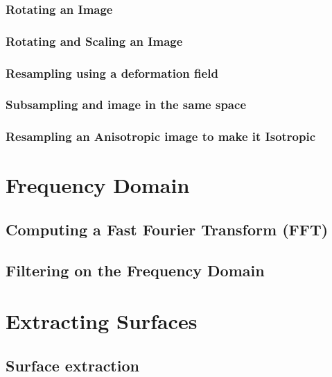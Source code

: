 \subsubsection{Rotating an Image}
\ifitkFullVersion

\fi

\subsubsection{Rotating and Scaling an Image}
\ifitkFullVersion

\fi

\subsubsection{Resampling using a deformation field}
\ifitkFullVersion

\fi


\subsubsection{Subsampling and image in the same space}
\label{SubsampleVolume}

\ifitkFullVersion

\fi



\subsubsection{Resampling an Anisotropic image to make it Isotropic}
\label{ResampleVolumesToBeIsotropic}

\ifitkFullVersion

\fi



\section{Frequency Domain}
\label{sec:FrequencyDomain}


\subsection{Computing a Fast Fourier Transform (FFT)}
\label{FFTImageFilter}

\ifitkFullVersion

\fi


\subsection{Filtering on the Frequency Domain}
\label{FFTImageFilterFourierDomainFiltering}

\ifitkFullVersion

\fi



\section{Extracting Surfaces}
\label{sec:ExtractingSurfaces}

\subsection{Surface extraction}
\label{sec:SufaceExtraction}

\ifitkFullVersion

\fi





